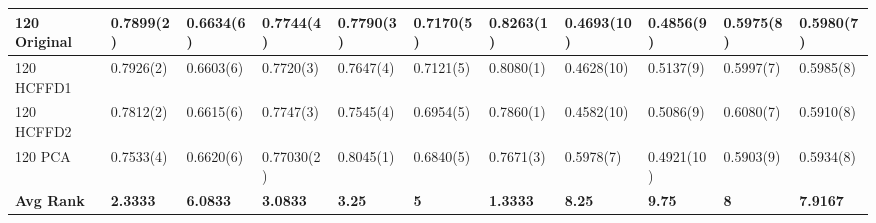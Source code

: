 \documentclass[conference]{IEEEtran}
\begin{document}
\begin{table}[]
\begin{tabular}{|l|l|l|l|l|l|l|l|l|l|l|l|l|l|l|l|l|l|l|l|l|}
120 Original      & \multicolumn{3}{l|}{0.7899(2)}                                                & \multicolumn{3}{l|}{0.6634(6)}       & \multicolumn{3}{l|}{0.7744(4)}       & \multicolumn{3}{l|}{0.7790(3)}                                                    & \multicolumn{3}{l|}{0.7170(5)}  & 0.8263(1)                                                & 0.4693(10)                                             & 0.4856(9)     & 0.5975(8)  & 0.5980(7)                                                 \\ \hline
120 HCFFD1        & \multicolumn{3}{l|}{0.7926(2)}                                                & \multicolumn{3}{l|}{0.6603(6)}       & \multicolumn{3}{l|}{0.7720(3)}       & \multicolumn{3}{l|}{0.7647(4)}                                                    & \multicolumn{3}{l|}{0.7121(5)}  & 0.8080(1)                                                & 0.4628(10)                                             & 0.5137(9)     & 0.5997(7)  & 0.5985(8)                                                 \\ \hline
120 HCFFD2        & \multicolumn{3}{l|}{0.7812(2)}                                                & \multicolumn{3}{l|}{0.6615(6)}       & \multicolumn{3}{l|}{0.7747(3)}       & \multicolumn{3}{l|}{0.7545(4)}                                                    & \multicolumn{3}{l|}{0.6954(5)}  & 0.7860(1)                                                & 0.4582(10)                                             & 0.5086(9)     & 0.6080(7)  & 0.5910(8)                                                 \\ \hline
120 PCA           & \multicolumn{3}{l|}{0.7533(4)}                                                & \multicolumn{3}{l|}{0.6620(6)}       & \multicolumn{3}{l|}{0.77030(2)}      & \multicolumn{3}{l|}{0.8045(1)}                                                    & \multicolumn{3}{l|}{0.6840(5)}  & 0.7671(3)                                                & 0.5978(7)                                              & 0.4921(10)    & 0.5903(9)  & 0.5934(8)                                                 \\ \hline
\textbf{Avg Rank} & \multicolumn{3}{l|}{\textbf{2.3333}}                                          & \multicolumn{3}{l|}{\textbf{6.0833}} & \multicolumn{3}{l|}{\textbf{3.0833}} & \multicolumn{3}{l|}{\textbf{3.25}}                                                & \multicolumn{3}{l|}{\textbf{5}} & \textbf{1.3333}                                          & \textbf{8.25}                                          & \textbf{9.75} & \textbf{8} & \textbf{7.9167}                                           \\ \hline
\end{tabular}
\end{table}
\end{document}
